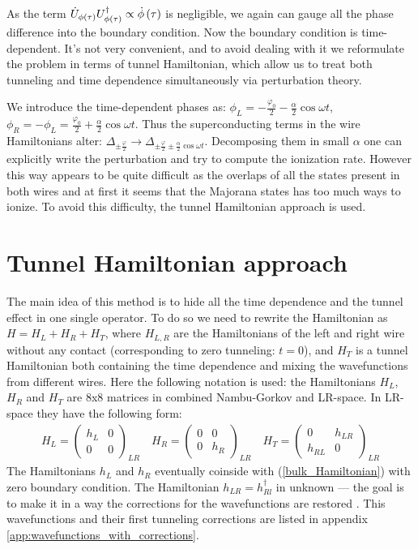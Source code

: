 As the term $ \dot{U}_{\phi\left(\tau\right)}U_{\phi\left(\tau\right)}^\dagger \propto \dot{\phi}\left(\tau\right)$ is negligible, we again can gauge all the phase difference into the boundary condition. Now the boundary condition is time-dependent. It's not very convenient, and to avoid dealing with it we reformulate the problem in terms  of tunnel Hamiltonian, which allow us to treat both tunneling and time dependence simultaneously via perturbation theory.



We introduce the time-dependent phases as: $ \phi_L=-\frac{\varphi_0}{2}-\frac{\alpha}{2}\cos \omega t $, $ \phi_R=-\phi_L=\frac{\varphi_0}{2}+\frac{\alpha}{2}\cos \omega t $. Thus the superconducting terms in the wire Hamiltonians alter: $ \Delta_{\pm\frac{\varphi}{2}} \to\Delta_{\pm\frac{\varphi}{2}\pm \frac{\alpha}{2}\cos \omega t} $. Decomposing them in small $ \alpha $ one can explicitly write the perturbation and try to compute the ionization rate. However this way appears to be quite difficult as the overlaps of all the states 
present in both wires and at first it seems that the Majorana states has too much ways to ionize. To avoid this difficulty, the tunnel Hamiltonian approach is used.

\fi

\section{Tunnel Hamiltonian approach}
\label{sec:tunnel_hamiltonian}
The main idea of this method is to hide all the time dependence and the tunnel effect in one single operator. To do so we need to rewrite the Hamiltonian as $ H=H_L+H_R+H_T $, where $ H_{L,R} $ are the Hamiltonians of the left and right wire without any contact (corresponding to zero tunneling: $ t=0 $), and $H_T  $ is a tunnel Hamiltonian both containing the time dependence and mixing the wavefunctions from different wires. 
Here the following notation is used: the Hamiltonians $ H_L $, $ H_R $ and $ H_T $ are 8x8 matrices in combined Nambu-Gorkov and LR-space. In LR-space they have the following form:
\begin{gather}
\label{tunnel_Hamiltonian_formalizm}
	H_L
	=
	\begin{pmatrix}
	h_L & 0 \\
	0 & 0
	\end{pmatrix}_{LR}
	\quad
	H_R
=
\begin{pmatrix}
0 & 0 \\
0 & h_R
\end{pmatrix}_{LR}
\quad
	H_T
=
\begin{pmatrix}
0 & h_{LR} \\
h_{RL} & 0
\end{pmatrix}_{LR}	
\end{gather}
The Hamiltonians $ h_L $ and $ h_R $ eventually coinside with (\ref{bulk_Hamiltonian}) with zero boundary condition. The Hamiltonian $ h_{LR}=h_{Rl}^\dagger $ in unknown --- the goal is to make it in a way the corrections for the wavefunctions are restored . This wavefunctions and their  first tunneling corrections are listed in  appendix \ref{app:wavefunctions_with_corrections}.

